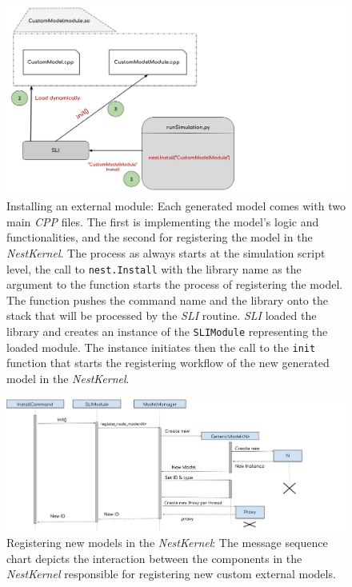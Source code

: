  
 \begin{figure}[ht!]
\centering
\includegraphics[width=1.2\textwidth,height=1.2\textheight,keepaspectratio]{src/pic/install_command.png}
\caption{Installing an external module: Each generated model comes with two main \emph{CPP} files. The first is implementing the model's logic and functionalities, and the second for registering the model in the \emph{NestKernel}. The process as always starts at the simulation script level, the call to \texttt{nest.Install} with the library name as the argument to the function starts the process of registering the model. The function pushes the command name and the library onto the stack that will be processed by the \emph{SLI} routine. \emph{SLI} loaded the library and creates an instance of the \texttt{SLIModule} representing the loaded module. The instance initiates then the call to the \texttt{init} function that starts the registering workflow of the new generated model in the \emph{NestKernel}.}
\label{fig:sli_install}
\end{figure}

\vspace{0.5cm}
\begin{figure}[ht!]
\centering
\includegraphics[width=1.2\textwidth,height=1.3\textheight,keepaspectratio]{src/pic/register.png}
\caption{ Registering new models in the \emph{NestKernel}: The message sequence chart depicts the interaction between the components in the \emph{NestKernel} responsible for registering new custom external models.}
\label{fig:nestknerl_register}
\end{figure}

